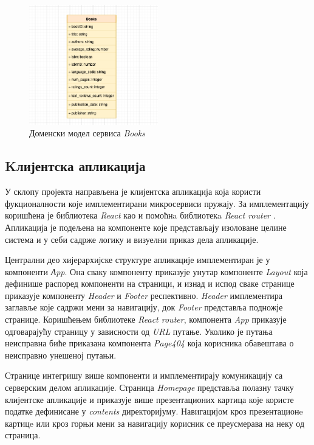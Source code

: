 \documentclass[12pt,oneside]{memoir}
\begin{document}
\begin{figure}[!ht]
  \centering
  \includegraphics[width=0.5\textwidth]{matfmaster/img/booksShema.png}
  \caption{Доменски модел сервиса \textit{Books}}
  \label{fig:booksShema}
\end{figure}
\newpage

\newpage


\subsection{Kлијентска апликација}

У склопу пројекта направљена је клијентска апликација која користи фукционалности које имплементирани микросервиси пружају. За имплементацију коришћена је библиотека \textit{React} као и помоћнa библиотекa \textit{React router} \cite{reactRouter}. Апликација је подељена на компоненте које представљају изоловане целине система и у себи садрже логику и визуелни приказ дела апликације.

Централни део хијерархијске структуре апликације имплементиран је у компоненти \textit{Аpp}. Она сваку компоненту приказује унутар компоненте \textit{Layout} која дефинише распоред компоненти на страници, и изнад и испод сваке странице приказује компоненту \textit{Header} и \textit{Footer} респективно. \textit{Header} имплементира заглавље које садржи мени за навигацију, док \textit{Footer} представља подножје странице. Коришћењем библиотеке \textit{React router}, компонента \textit{App} приказује одговарајућу страницу у зависности од \textit{URL} путање. Уколико је путања неисправна биће приказана компонента \textit{Page404} која корисника обавештава о неисправно унешеној путањи.  

Странице интегришу више компоненти и имплементирају комуникацију са серверским делом апликације. Страница \textit{Homepage} представља полазну тачку клијентске апликације и приказује више презентационих картица које користе податке дефинисане у \textit{contents} директоријуму. Навигацијом кроз презентационe картицe или кроз горњи мени за навигацију корисник се преусмерава на неку од страница. 
\end{document}

